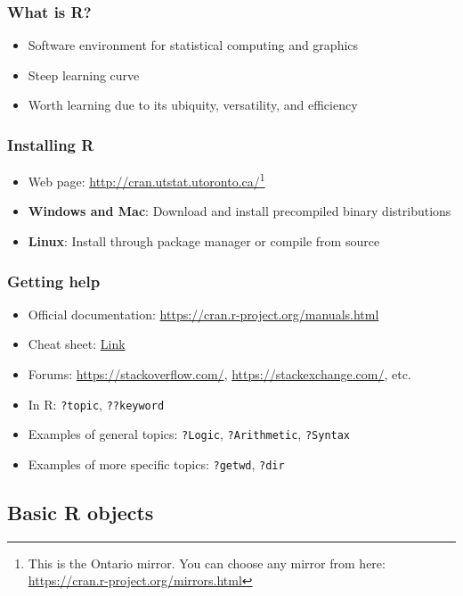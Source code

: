 \documentclass{beamer}
\begin{document}
\begin{frame}
    \frametitle{What is R?}
    \begin{itemize}
	  \item Software environment for statistical computing and graphics
	  \item Steep learning curve
	  \item Worth learning due to its ubiquity, versatility, and efficiency
    \end{itemize}
\end{frame}


\begin{frame}
	\frametitle{Installing R}
	\begin{itemize}
	  \item Web page: \url{http://cran.utstat.utoronto.ca/}\footnote{This is the Ontario mirror. You can choose any mirror from here: \url{https://cran.r-project.org/mirrors.html}}
	  \item \textbf{Windows and Mac}: Download and install precompiled binary distributions
	  \item \textbf{Linux}: Install through package manager or compile from source
	\end{itemize}
\end{frame}


\begin{frame}
    \frametitle{Getting help}
    \begin{itemize}
	  \item Official documentation: \url{https://cran.r-project.org/manuals.html}
	  \item Cheat sheet: \href{https://cran.r-project.org/doc/contrib/Short-refcard.pdf}{Link}
	  \item Forums: \url{https://stackoverflow.com/}, \url{https://stackexchange.com/}, etc.
	  \item In R: \texttt{?topic}, \texttt{??keyword}
	  \item Examples of general topics: \texttt{?Logic}, \texttt{?Arithmetic}, \texttt{?Syntax}
	  \item Examples of more specific topics: \texttt{?getwd}, \texttt{?dir}
    \end{itemize}
\end{frame}


\subsection{Basic R objects}
\end{document}
